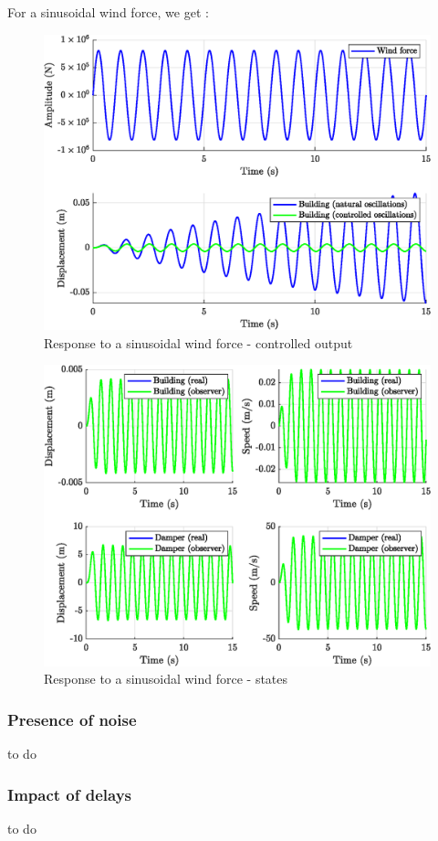 For a sinusoidal wind force, we get : 
\begin{figure}[H]
    \centering
    \includegraphics[width=\textwidth]{resources/eps/sinusoidal-controller.eps}
    \caption{Response to a sinusoidal wind force - controlled output}
\end{figure}
\begin{figure}[H]
    \centering
    \includegraphics[width=\textwidth]{resources/eps/sinusoidal-observer.eps}
    \caption{Response to a sinusoidal wind force - states}
\end{figure}

\subsubsection{Presence of noise}
to do

\subsubsection{Impact of delays}
to do
